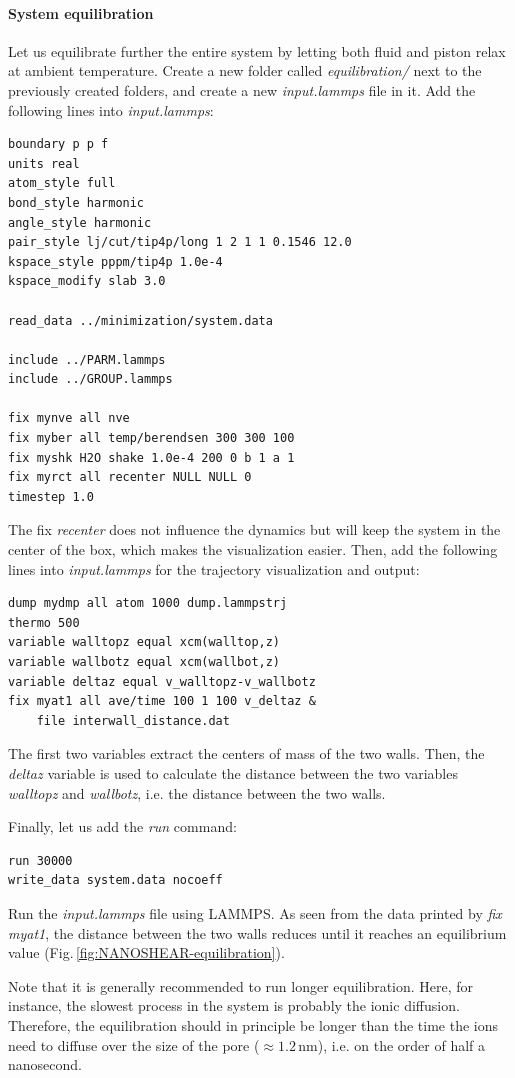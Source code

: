 \documentclass[9pt,tutorial]{livecoms}
\begin{document}
\paragraph{System equilibration}
Let us equilibrate further the entire system by letting both fluid and piston relax at ambient temperature. Create a new folder called \textit{equilibration/} next to the previously created folders, and create a new \textit{input.lammps} file in it. Add the following lines into \textit{input.lammps}:
{\normalsize \begin{verbatim}
boundary p p f
units real
atom_style full
bond_style harmonic
angle_style harmonic
pair_style lj/cut/tip4p/long 1 2 1 1 0.1546 12.0
kspace_style pppm/tip4p 1.0e-4
kspace_modify slab 3.0

read_data ../minimization/system.data

include ../PARM.lammps
include ../GROUP.lammps

fix mynve all nve
fix myber all temp/berendsen 300 300 100
fix myshk H2O shake 1.0e-4 200 0 b 1 a 1
fix myrct all recenter NULL NULL 0
timestep 1.0
\end{verbatim}}
The fix \textit{recenter} does not influence the dynamics but will keep the system in the center of the box, which makes the
visualization easier. Then, add the following lines into \textit{input.lammps} for the trajectory visualization and output:
{\normalsize \begin{verbatim}
dump mydmp all atom 1000 dump.lammpstrj
thermo 500
variable walltopz equal xcm(walltop,z)
variable wallbotz equal xcm(wallbot,z)
variable deltaz equal v_walltopz-v_wallbotz
fix myat1 all ave/time 100 1 100 v_deltaz &
    file interwall_distance.dat
\end{verbatim}}
The first two variables extract the centers of mass of the two walls. Then, the \textit{deltaz} variable is used to calculate the distance between the two variables \textit{walltopz} and \textit{wallbotz}, i.e. the distance between the two walls.

Finally, let us add the \textit{run} command:
{\normalsize \begin{verbatim}
run 30000
write_data system.data nocoeff
\end{verbatim}}
Run the \textit{input.lammps} file using LAMMPS. As seen from the data printed by \textit{fix myat1}, the distance between the two walls reduces until it reaches an equilibrium value (Fig.\,\ref{fig:NANOSHEAR-equilibration}).

Note that it is generally recommended to run longer equilibration. Here, for instance, the slowest process in the system is probably the ionic diffusion. Therefore, the equilibration should in principle be longer than the time
the ions need to diffuse over the size of the pore ($\approx 1.2\,\text{nm}$), i.e. on the order of half a nanosecond.
\end{document}
